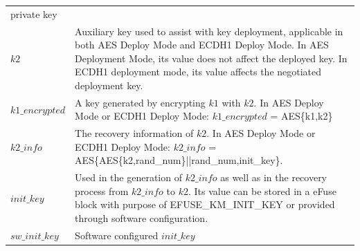 \documentclass[main\_\_EN.tex]{subfiles}
\begin{document}
\begin{longtable}[c]{ R{6cm} p{10cm} }
private key \\
\textbf{\begin{math}k2\end{math}} \label{para:k2} & Auxiliary key used to assist with key deployment, applicable in both AES Deploy Mode and ECDH1 Deploy Mode. In AES Deployment Mode, its value does not affect the deployed key. In ECDH1 deployment mode, its value affects the negotiated deployment key. \\
\textbf{\begin{math}k1\_encrypted\end{math}}\label{para:k1enc} & A key generated by encrypting \begin{math}k1\end{math} with \begin{math}k2\end{math}. In AES Deploy Mode or ECDH1 Deploy Mode: \begin{math}k1\_encrypted\end{math} = AES\{k1,k2\}\\
\textbf{\begin{math}k2\_info\end{math}}\label{para:k2info} & The recovery information of \begin{math}k2\end{math}. In AES Deploy Mode or ECDH1 Deploy Mode: \begin{math}k2\_info\end{math} = AES\{AES\{k2,rand\_num\}||rand\_num,init\_key\}.\\
\textbf{\begin{math}init\_key\end{math}}\label{para:initkey} & Used in the generation of \begin{math}k2\_info\end{math} as well as in the recovery process from \begin{math}k2\_info\end{math} to \begin{math}k2\end{math}. Its value can be stored in a eFuse block with purpose of EFUSE\_KM\_INIT\_KEY or provided through software configuration. \\
\textbf{\begin{math}sw\_init\_key\end{math}} \label{para:swinitkey} & Software configured  \begin{math}init\_key\end{math}\\

\end{longtable}
\end{document}
